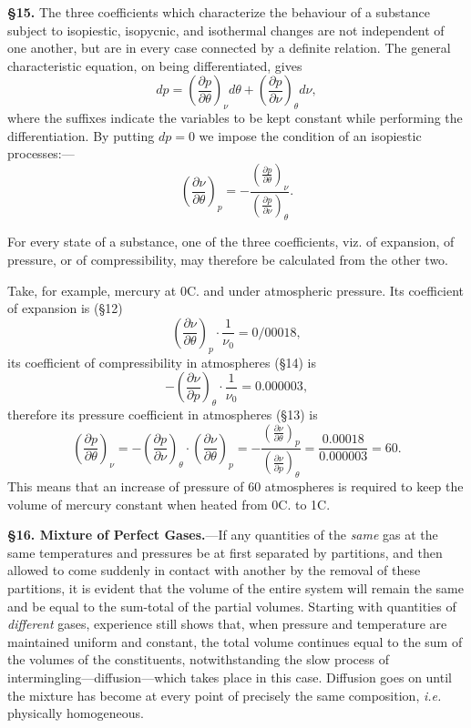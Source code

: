 \documentclass[oneside,12pt]{book}
\begin{document}
\textbf{\S 15.} The three coefficients which characterize the behaviour of a substance subject to isopiestic, isopycnic, and isothermal changes are not independent of one another, but are in every case connected by a definite relation. The general characteristic equation, on being differentiated, gives
$$dp=\left(\frac{\partial p}{\partial \theta}\right)_\nu d\theta+\left(\frac{\partial p}{\partial\nu}\right)_\theta d\nu,$$
where the suffixes indicate the variables to be kept constant while performing the differentiation. By putting $dp=0$ we impose the condition of an isopiestic processes:---
\begin{equation}
    \left(\frac{\partial\nu}{\partial\theta}\right)_p=-\frac{\left(\frac{\partial p}{\partial\theta}\right)_\nu}{\left(\frac{\partial p}{\partial\nu}\right)_\theta}.
    \label{eq6}
\end{equation} \par

For every state of a substance, one of the three coefficients, viz. of expansion, of pressure, or of compressibility, may therefore be calculated from the other two. \par

Take, for example, mercury at 0\degree C. and under atmospheric pressure. Its coefficient of expansion is (\S 12)
\begin{equation*}
    \left(\frac{\partial\nu}{\partial\theta}\right)_p\cdot\frac{1}{\nu_0}=0/00018,
\end{equation*}
its coefficient of compressibility in atmospheres (\S 14) is
$$-\left(\frac{\partial\nu}{\partial p}\right)_\theta\cdot\frac{1}{\nu_0}=0.000003,$$
therefore its pressure coefficient in atmospheres (\S 13) is
$$\left(\frac{\partial p}{\partial\theta}\right)_\nu=-\left(\frac{\partial p}{\partial\nu}\right)_\theta\cdot\left(\frac{\partial \nu}{\partial\theta}\right)_p=-\frac{\left(\frac{\partial\nu}{\partial\theta}\right)_p}{\left(\frac{\partial\nu}{\partial p}\right)_\theta}=\frac{0.00018}{0.000003}=60.$$
This means that an increase of pressure of 60 atmospheres is required to keep the volume of mercury constant when heated from 0\degree C. to 1\degree C. \par

\textbf{\S 16. Mixture of Perfect Gases.}---If any quantities of the \textit{same} gas at the same temperatures and pressures be at first separated by partitions, and then allowed to come suddenly in contact with another by the removal of these partitions, it is evident that the volume of the entire system will remain the same and be equal to the sum-total of the partial volumes. Starting with quantities of \textit{different} gases, experience still shows that, when pressure and temperature are maintained uniform and constant, the total volume continues equal to the sum of the volumes of the constituents, notwithstanding the slow process of intermingling---diffusion---which takes place in this case. Diffusion goes on until the mixture has become at every point of precisely the same composition, \textit{i.e.} physically homogeneous. \par
\end{document}
